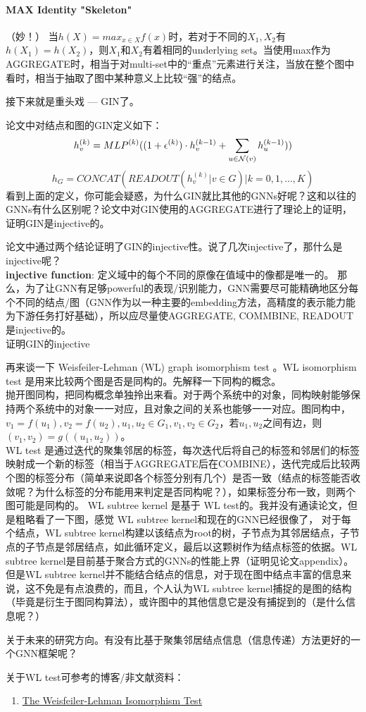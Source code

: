 \paragraph{MAX Identity "Skeleton"}（妙！） 当$h(X) = max_{x\in X}f(x)$时，若对于不同的$X_1, X_2$有$h(X_1) = h(X_2)$，则$X_1$和$X_2$有着相同的underlying set。当使用max作为AGGREGATE时，相当于对multi-set中的“重点”元素进行关注，当放在整个图中看时，相当于抽取了图中某种意义上比较“强”的结点。

\par 接下来就是重头戏 --- GIN了。
\par 论文中对结点和图的GIN定义如下：
$$
h_v^{(k)} = MLP^{(k)} ((1+\epsilon^{(k)} ) \cdot h_v^{(k-1)}+\sum_{u \in \mathcal{N}(v)} h_u^{(k-1)} ))  \newline
$$
$$
h_G = CONCAT(READOUT({h_v^{(k)} | v \in G}) | k = 0,1,...,K)
$$
看到上面的定义，你可能会疑惑，为什么GIN就比其他的GNNs好呢？这和以往的GNNs有什么区别呢？论文中对GIN使用的AGGREGATE进行了理论上的证明，证明GIN是injective的。
\par 论文中通过两个结论证明了GIN的injective性。说了几次injective了，那什么是injective呢？\\
\textbf{injective function}: 定义域中的每个不同的原像在值域中的像都是唯一的。
那么，为了让GNN有足够powerful的表现/识别能力，GNN需要尽可能精确地区分每个不同的结点/图（GNN作为以一种主要的embedding方法，高精度的表示能力能为下游任务打好基础），所以应尽量使AGGREGATE, COMMBINE, READOUT 是injective的。\\
{\color{red}证明GIN的injective}

\par 再来谈一下  Weisfeiler-Lehman (WL) graph isomorphism test 。WL isomorphism test 是用来比较两个图是否是同构的。先解释一下同构的概念。\\
抛开图同构，把同构概念单独拎出来看。对于两个系统中的对象，同构映射能够保持两个系统中的对象一一对应，且对象之间的关系也能够一一对应。图同构中，$v_1 = f(u_1), v_2 = f(u_2),u_1, u_2 \in G_1, v_1, v_2 \in G_2$，若$u_1, u_2$之间有边，则$(v_1, v_2) = g((u_1, u_2))$。\\
WL test 是通过迭代的聚集邻居的标签，每次迭代后将自己的标签和邻居们的标签映射成一个新的标签（相当于AGGREGATE后在COMBINE），迭代完成后比较两个图的标签分布（简单来说即各个标签分别有几个）是否一致（{\color{red}结点的标签能否收敛呢？为什么标签的分布能用来判定是否同构呢？}），如果标签分布一致，则两个图可能是同构的。
WL subtree kernel\cite{shervashidze2011weisfeiler} 是基于 WL test的。我并没有通读论文，但是粗略看了一下图，感觉 WL subtree kernel和现在的GNN已经很像了， 对于每个结点，WL subtree kernel构建以该结点为root的树，子节点为其邻居结点，子节点的子节点是邻居结点，如此循环定义，最后以这颗树作为结点标签的依据。WL subtree kernel是目前基于聚合方式的GNNs的性能上界（证明见论文appendix）。但是WL subtree kernel并不能结合结点的信息，对于现在图中结点丰富的信息来说，这不免是有点浪费的，而且，个人认为WL subtree kernel捕捉的是图的结构（毕竟是衍生于图同构算法），或许图中的其他信息它是没有捕捉到的（{\color{red}是什么信息呢？}） 

\par 关于未来的研究方向。有没有比基于聚集邻居结点信息（信息传递）方法更好的一个GNN框架呢？

关于WL test可参考的博客/非文献资料：
\begin{enumerate}
    \item \href{https://www.davidbieber.com/post/2019-05-10-weisfeiler-lehman-isomorphism-test/}{The Weisfeiler-Lehman Isomorphism Test}
\end{enumerate}

